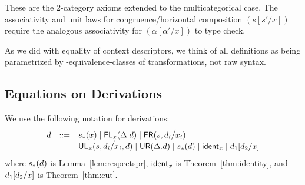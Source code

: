 \noindent These are the 2-category axioms extended to the
multicategorical case.  The associativity and unit laws for
congruence/horizontal composition $(s[s'/x])$ require the analogous
associativity for $(\alpha[\alpha'/x])$ to type check.

As we did with equality of context descriptors, we think of all
definitions as being parametrized by \deq-equivalence-classes of
transformations, not raw syntax.

\subsection{Equations on Derivations}

\newcommand\FLd[2]{\ensuremath{\FL_{#1}(#2)}}
\newcommand\FRd[2]{\ensuremath{\FR(#1,#2)}}
\newcommand\ULd[4]{\ensuremath{\UL_{#1}(#2,#3,#4)}}
\newcommand\URd[1]{\ensuremath{\UR(#1)}}
\newcommand\Trd[2]{\ensuremath{#1_*(#2)}}
\newcommand\Ident[1]{\ensuremath{\dsd{ident}_{#1}}}
\newcommand\Cut[3]{\ensuremath{#1[#2/#3]}}

We use the following notation for derivations:
\[
\begin{array}{rcl}
\D & ::= & \Trd{s}{x} \mid \FLd{x}{\Delta.\D} \mid \FRd{s}{\vec{\D_i/x_i}} \\
& & \ULd{x}{s}{\vec{\D_i/x_i}}{\D} \mid \URd{\Delta.\D} \mid \Trd{s}{\D} \mid
\Ident{x} \mid \Cut{\D_1}{\D_2}{x}
\end{array}
\]
where \Trd{s}{\D} is Lemma~\ref{lem:respectspr}, \Ident{x} is
Theorem~\ref{thm:identity}, and \Cut{\D_1}{\D_2}{x} is
Theorem~\ref{thm:cut}.

